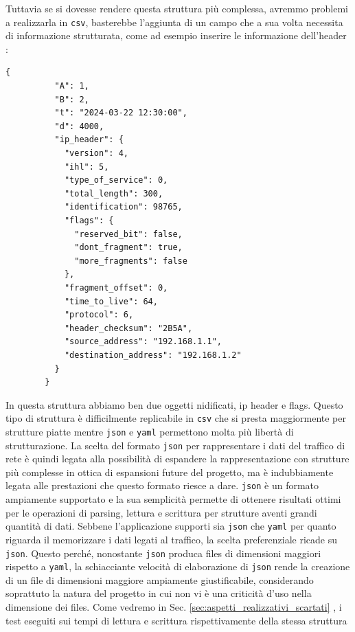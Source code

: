 \documentclass[binding=0.6cm]{sapthesis}
\begin{document}
Tuttavia se si dovesse rendere questa struttura più complessa, avremmo problemi a realizzarla in \texttt{csv}, basterebbe l'aggiunta
di un campo che a sua volta necessita di informazione strutturata, come ad esempio 
inserire le informazione dell'header \cite{RFC791}:
{\scriptsize %
\begin{lstlisting}[caption={Pacchetto di rete maggiormente strutturato in \texttt{json}}]
        {
          "A": 1,
          "B": 2,
          "t": "2024-03-22 12:30:00",
          "d": 4000,
          "ip_header": {
            "version": 4,
            "ihl": 5,
            "type_of_service": 0,
            "total_length": 300,
            "identification": 98765,
            "flags": {
              "reserved_bit": false,
              "dont_fragment": true,
              "more_fragments": false
            },
            "fragment_offset": 0,
            "time_to_live": 64,
            "protocol": 6,
            "header_checksum": "2B5A",
            "source_address": "192.168.1.1",
            "destination_address": "192.168.1.2"
          }
        }
\end{lstlisting}
}
In questa struttura abbiamo ben due oggetti nidificati, ip header e flags. 
Questo tipo di struttura è difficilmente replicabile in \texttt{csv} che si presta maggiormente
per strutture piatte mentre \texttt{json} e \texttt{yaml} permettono molta più libertà di strutturazione.
La scelta del formato \texttt{json} per rappresentare i dati del traffico di rete è quindi legata alla possibilità di espandere la
rappresentazione con strutture più complesse in ottica di espansioni future del progetto, ma è indubbiamente legata alle prestazioni che questo formato riesce a dare.
\texttt{json} è un formato ampiamente supportato e la sua semplicità permette di ottenere risultati ottimi per le operazioni di parsing, lettura e scrittura per strutture aventi grandi quantità di dati.
Sebbene l'applicazione supporti sia \texttt{json} che \texttt{yaml} per quanto riguarda il memorizzare i dati legati al traffico, la scelta preferenziale ricade su \texttt{json}.
Questo perché, nonostante \texttt{json} produca files di dimensioni maggiori rispetto a \texttt{yaml}, la schiacciante velocità di elaborazione di \texttt{json} rende la creazione di
un file di dimensioni maggiore ampiamente giustificabile, considerando soprattuto la natura del progetto in cui non vi è una
criticità d'uso nella dimensione dei files. Come vedremo in Sec. \ref{sec:aspetti_realizzativi_scartati} , i test eseguiti sui tempi di lettura e scrittura rispettivamente della stessa struttura
\end{document}
